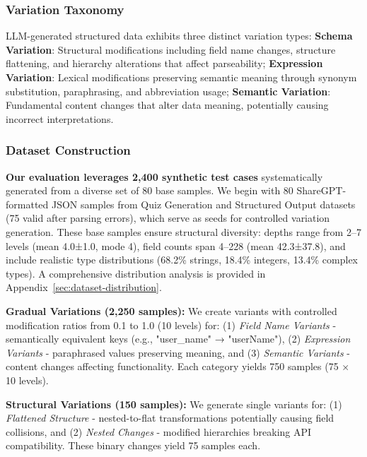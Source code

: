 \documentclass{article}
\begin{document}
\subsubsection{Variation Taxonomy}
LLM-generated structured data exhibits three distinct variation types: \textbf{Schema Variation}: Structural modifications including field name changes, structure flattening, and hierarchy alterations that affect parseability; \textbf{Expression Variation}: Lexical modifications preserving semantic meaning through synonym substitution, paraphrasing, and abbreviation usage; \textbf{Semantic Variation}: Fundamental content changes that alter data meaning, potentially causing incorrect interpretations.

\subsubsection{Dataset Construction}

\textbf{Our evaluation leverages 2,400 synthetic test cases} systematically generated from a diverse set of 80 base samples. We begin with 80 ShareGPT-formatted JSON samples from Quiz Generation and Structured Output datasets (75 valid after parsing errors), which serve as seeds for controlled variation generation. These base samples ensure structural diversity: depths range from 2--7 levels (mean 4.0±1.0, mode 4), field counts span 4--228 (mean 42.3±37.8), and include realistic type distributions (68.2\% strings, 18.4\% integers, 13.4\% complex types). A comprehensive distribution analysis is provided in Appendix~\ref{sec:dataset-distribution}.

\textbf{Gradual Variations (2,250 samples):} We create variants with controlled modification ratios from 0.1 to 1.0 (10 levels) for: (1) \textit{Field Name Variants} - semantically equivalent keys (e.g., "user\_name" → "userName"), (2) \textit{Expression Variants} - paraphrased values preserving meaning, and (3) \textit{Semantic Variants} - content changes affecting functionality. Each category yields 750 samples (75 × 10 levels).

\textbf{Structural Variations (150 samples):} We generate single variants for: (1) \textit{Flattened Structure} - nested-to-flat transformations potentially causing field collisions, and (2) \textit{Nested Changes} - modified hierarchies breaking API compatibility. These binary changes yield 75 samples each.
\end{document}

